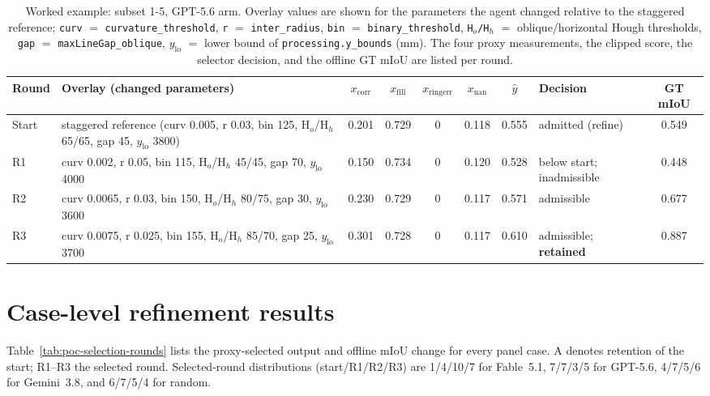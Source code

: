 \documentclass[a4paper,fleqn]{cas-dc}
\begin{document}
\begin{table}[t]
\caption{Worked example: subset 1-5, GPT-5.6 arm. Overlay values are shown for the parameters the agent changed relative to the staggered reference; \texttt{curv} $=$ \texttt{curvature\_threshold}, \texttt{r} $=$ \texttt{inter\_radius}, \texttt{bin} $=$ \texttt{binary\_threshold}, \texttt{H$_{o}$/H$_{h}$} $=$ oblique/horizontal Hough thresholds, \texttt{gap} $=$ \texttt{maxLineGap\_oblique}, $y_{\mathrm{lo}}$ $=$ lower bound of \texttt{processing.y\_bounds} (mm). The four proxy measurements, the clipped score, the selector decision, and the offline GT mIoU are listed per round.}
\label{tab:worked-example}
\centering
\footnotesize
\setlength{\tabcolsep}{3.5pt}
\begin{tabular}{l Y{0.36\textwidth} c c c c c Y{0.13\textwidth} c}
\toprule
Round & Overlay (changed parameters) & $x_{\mathrm{corr}}$ & $x_{\mathrm{fill}}$ & $x_{\mathrm{ringerr}}$ & $x_{\mathrm{nan}}$ & $\hat y$ & Decision & GT mIoU \\
\midrule
Start & staggered reference (curv 0.005, r 0.03, bin 125, H$_o$/H$_h$ 65/65, gap 45, $y_{\mathrm{lo}}$ 3800) & 0.201 & 0.729 & 0 & 0.118 & 0.555 & admitted (refine) & 0.549 \\
R1 & curv 0.002, r 0.05, bin 115, H$_o$/H$_h$ 45/45, gap 70, $y_{\mathrm{lo}}$ 4000 & 0.150 & 0.734 & 0 & 0.120 & 0.528 & below start; inadmissible & 0.448 \\
R2 & curv 0.0065, r 0.03, bin 150, H$_o$/H$_h$ 80/75, gap 30, $y_{\mathrm{lo}}$ 3600 & 0.230 & 0.729 & 0 & 0.117 & 0.571 & admissible & 0.677 \\
R3 & curv 0.0075, r 0.025, bin 155, H$_o$/H$_h$ 85/70, gap 25, $y_{\mathrm{lo}}$ 3700 & 0.301 & 0.728 & 0 & 0.117 & 0.610 & admissible; \textbf{retained} & 0.887 \\
\bottomrule
\end{tabular}
\end{table}

\section{Case-level refinement results}\label{app:poc-selection}

Table~\ref{tab:poc-selection-rounds} lists the proxy-selected output and offline mIoU change for every panel case. A denotes retention of the start; R1--R3 the selected round. Selected-round distributions (start/R1/R2/R3) are 1/4/10/7 for Fable~5.1, 7/7/3/5 for GPT-5.6, 4/7/5/6 for Gemini~3.8, and 6/7/5/4 for random.
\end{document}
